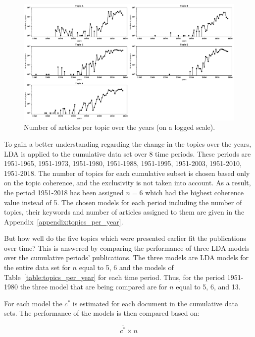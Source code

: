 \documentclass{article}
\theoremstyle{definition}
\begin{document}
\begin{figure}[!hbtp]
    \centering
    \includegraphics[width=\textwidth]{./assets/images/papers_per_topic_over_time.pdf}
    \caption{Number of articles per topic over the years (on a logged scale).}\label{fig:number_of_articles_per_topic}
\end{figure}

To gain a better understanding regarding the change in the topics over the years,
LDA is applied to the cumulative data set over 8 time periods. These periods are
1951-1965, 1951-1973, 1951-1980, 1951-1988, 1951-1995, 1951-2003, 1951-2010,
1951-2018. The number of topics for each cumulative subset is chosen based only
on the topic coherence, and the exclusivity is not taken into account. As a result,
the period 1951-2018 has been assigned \(n=6\) which had the highest coherence
value instead of 5. The chosen models for each period including the
number of topics, their keywords and number of articles assigned to them are
given in the Appendix~\ref{appendix:topics_per_year}.

But how well do the five topics which were presented earlier fit the
publications over time? This is answered by comparing the performance of three
LDA models over the cumulative periods' publications. The three models are LDA
models for the entire data set for \(n\) equal to 5, 6 and the models of
Table~\ref{table:topics_per_year} for each time period. Thus, for the period
1951-1980 the three model that are being compared are for $n$ equal to 5, 6, and
13.

For each model the \(c^*\) is estimated for each document in the cumulative data
sets. The performance of the models is then compared based on:

\begin{equation}\label{eq:ratio}
    \bar{c^*} \times n
\end{equation}
\end{document}
